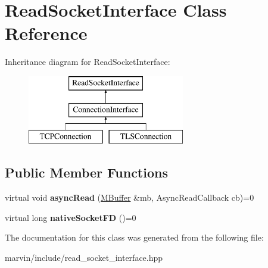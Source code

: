 \hypertarget{class_read_socket_interface}{}\section{Read\+Socket\+Interface Class Reference}
\label{class_read_socket_interface}
Inheritance diagram for Read\+Socket\+Interface\+:\begin{figure}[H]
\begin{center}
\leavevmode
\includegraphics[height=3.000000cm]{class_read_socket_interface}
\end{center}
\end{figure}
\subsection*{Public Member Functions}
\begin{DoxyCompactItemize}
\item 
\mbox{\label{class_read_socket_interface_a012ec2a7ec7b6b1142e8e1a808e27442}} 
virtual void {\bfseries async\+Read} (\hyperlink{struct_m_buffer}{M\+Buffer} \&mb, Async\+Read\+Callback cb)=0
\item 
\mbox{\label{class_read_socket_interface_a51b24e615ebc0d887585affcc9d269af}} 
virtual long {\bfseries native\+Socket\+FD} ()=0
\end{DoxyCompactItemize}


The documentation for this class was generated from the following file\+:\begin{DoxyCompactItemize}
\item 
marvin/include/read\+\_\+socket\+\_\+interface.\+hpp\end{DoxyCompactItemize}
